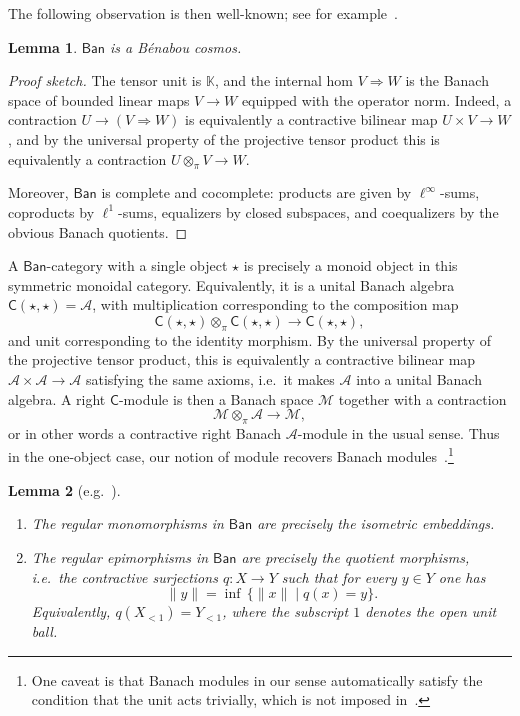 \documentclass[11pt,onecolumn]{article}
\newcommand{\K}{\mathbb{K}}
\newcommand{\cC}{\mathsf{C}}
\newcommand{\Ban}{\mathsf{Ban}}
\theoremstyle{plain}
\newtheorem{lem}[lem]{Lemma}
\theoremstyle{remark}
\theoremstyle{definition}
\begin{document}
The following observation is then well-known; see for example~\cite{CiglerLosertMichor}.

\begin{lem}
	$\Ban$ is a B\'enabou cosmos.
\end{lem}

\begin{proof}[Proof sketch]
	The tensor unit is $\K$, and the internal hom $V \Rightarrow W$ is the Banach space of bounded linear maps $V \to W$ equipped with the operator norm.
	Indeed, a contraction $U \to (V \Rightarrow W)$ is equivalently a contractive bilinear map $U \times V \to W$, and by the universal property of the projective tensor product this is equivalently a contraction $U \otimes_\pi V \to W$.

	Moreover, $\Ban$ is complete and cocomplete: products are given by $\ell^\infty$-sums, coproducts by $\ell^1$-sums,
	equalizers by closed subspaces, and coequalizers by the obvious Banach quotients.
\end{proof}

A $\Ban$-category with a single object $\star$ is precisely a monoid object in this symmetric monoidal category.
Equivalently, it is a unital Banach algebra $\cC(\star, \star) = \mathcal{A}$, with multiplication
corresponding to the composition map 
\begin{equation}
	\label{CstarA}
	\cC(\star, \star) \otimes_\pi \cC(\star, \star) \longrightarrow \cC(\star, \star),
\end{equation}
and unit corresponding to the identity morphism.
By the universal property of the projective tensor product, this is equivalently a contractive bilinear map $\mathcal{A} \times \mathcal{A} \to \mathcal{A}$ satisfying the same axioms, i.e.~it makes $\mathcal{A}$ into a unital Banach algebra.
A right $\cC$-module is then a Banach space $\mathcal{M}$ together with a contraction
\[
	\mathcal{M} \otimes_\pi \mathcal{A} \longrightarrow \mathcal{M},
\]
or in other words a contractive right Banach $\mathcal{A}$-module in the usual sense.
Thus in the one-object case, our notion of module recovers Banach modules~\cite[1.6]{CiglerLosertMichor}.\footnote{One caveat is that Banach modules in our sense automatically satisfy the condition that the unit acts trivially, which is not imposed in~\cite[1.6]{CiglerLosertMichor}.}

\begin{lem}[{e.g.~\cite[\S 4.3.10(e)]{Borceux}}]
	\begin{enumerate}
		\item The regular monomorphisms in $\Ban$ are precisely the isometric embeddings. 
		\item The regular epimorphisms in $\Ban$ are precisely the quotient morphisms, i.e.~the contractive surjections $q \colon X \to Y$ such that for every $y \in Y$ one has
			\[
				\|y\| = \inf \, \{\|x\| \mid q(x)=y\}.
			\]
			Equivalently, $q(X_{<1})=Y_{<1}$, where the subscript $1$ denotes the open unit ball.
	\end{enumerate}
\end{lem}
\end{document}
